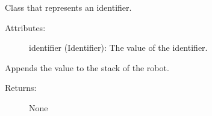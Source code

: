 \documentclass[letterpaper,10pt,english]{sphinxmanual}
\begin{document}

\begin{fulllineitems}
\label{\detokenize{expressions:robol_lang.expressions.Identifier}}
\sphinxAtStartPar
Class that represents an identifier.
\begin{description}
\item[{Attributes:}] \leavevmode
\sphinxAtStartPar
identifier (Identifier): The value of the identifier.

\end{description}

\begin{fulllineitems}
\label{\detokenize{expressions:robol_lang.expressions.Identifier.interpret}}
\sphinxAtStartPar
Appends the value to the stack of the robot.
\begin{description}
\item[{Returns:}] \leavevmode
\sphinxAtStartPar
None

\end{description}

\end{fulllineitems}


\end{fulllineitems}

\end{document}

